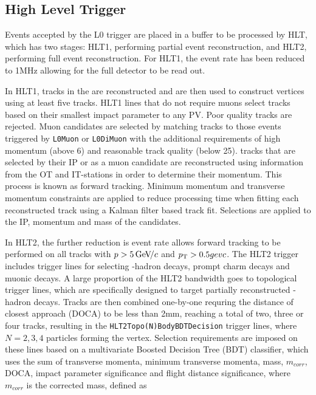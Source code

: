 \subsection{High Level Trigger}

Events accepted by the L0 trigger are placed in a buffer to be processed by HLT, which has two stages: HLT1, performing partial event reconstruction, and HLT2, performing full event reconstruction. For HLT1, the event rate has been reduced to 1MHz allowing for the full detector to be read out.

In HLT1, tracks in the \velo are reconstructed and are then used to construct vertices using at least five tracks. HLT1 lines that do not require muons select \velo tracks based on their smallest impact parameter to any PV. Poor quality \velo tracks are rejected. Muon candidates are selected by matching \velo tracks to those events triggered by {\tt L0Muon} or {\tt L0DiMuon} with the additional requirements of high momentum (above 6\gevc) and reasonable track quality (\chisqndf below 25). \velo tracks that are selected by their IP or as a muon candidate are reconstructed using information from the OT and IT-stations in order to determine their momentum. This process is known as forward tracking. Minimum momentum and transverse momentum constraints are applied to reduce processing time when fitting each reconstructed track using a Kalman filter based track fit. Selections are applied to the IP, momentum and mass of the candidates.

In HLT2, the further reduction is event rate allows forward tracking to be performed on all \velo tracks with $p > 5{\mathrm{\,Ge\kern -0.1em V\!/}c}$ and $\mbox{$p_{\mathrm{ T}}$} > 0.5gevc$. The HLT2 trigger includes trigger lines for selecting \bquark-hadron decays, prompt charm decays and muonic decays. A large proportion of the HLT2 bandwidth goes to topological trigger lines, which are specifically designed to target partially reconstructed \bquark-hadron decays. Tracks are then combined one-by-one requring the distance of closest approach (DOCA) to be less than 2mm, reaching a total of two, three or four tracks, resulting in the {\tt HLT2Topo(N)BodyBDTDecision} trigger lines, where $N = 2,3,4$ particles forming the vertex. Selection requirements are imposed on these lines based on a multivariate Boosted Decision Tree (BDT) classifier, which uses the sum of transverse momenta, minimum transverse momenta, mass, $m_{corr}$, DOCA, impact parameter significance and flight distance significance, where $m_{corr}$ is the corrected mass, defined as

